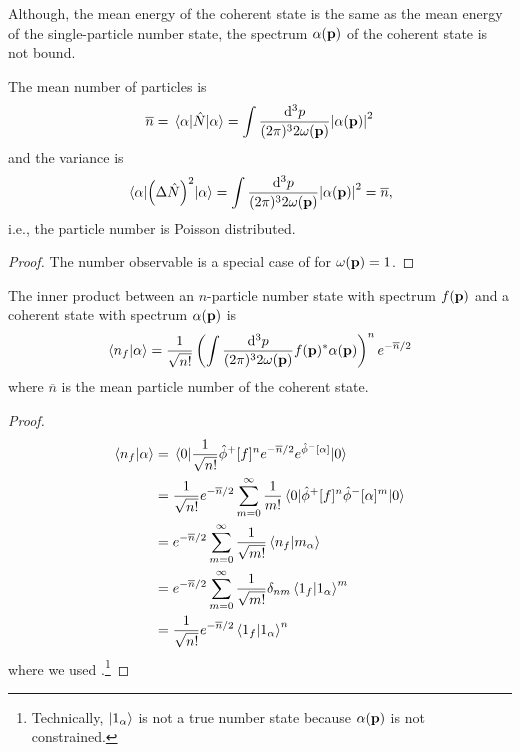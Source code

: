 Although, the mean energy of the coherent state is the same as the mean energy of the single-particle number state, the spectrum $\alpha(\vb{p})$ of the coherent state is not bound.
\begin{lemma}\label{thm:qkg_coherent_state_number}
	The mean number of particles is
	\begin{equation}
		\overline{n}
		=
		\expval{\hat{N}}{\alpha}
		=
		\int\frac{\dd[3]{p}}{(2\pi)^32\omega(\vb{p})}
		\abs{\alpha(\vb{p})}^2
	\end{equation}
	and the variance is
	\begin{equation}
		\expval{\left(\Delta\hat{N}\right)^2}{\alpha}
		=
		\int\frac{\dd[3]{p}}{(2\pi)^32\omega(\vb{p})}
		\abs{\alpha(\vb{p})}^2
		=
		\overline{n}
		,
	\end{equation}
	i.e., the particle number is Poisson distributed.
\end{lemma}
\begin{proof}
	The number observable is a special case of  for $\omega(\vb{p})=1$.
\end{proof}

\begin{lemma}\label{thm:qkg_coherent_state_number_state_inner_product}
	The inner product between an $n$-particle number state with spectrum $f(\vb{p})$ and a coherent state with spectrum $\alpha(\vb{p})$ is
	\begin{equation}
		\braket{n_f}{\alpha}
		=
		\frac{1}{\sqrt{n!}}
		\left(
			\int\frac{\dd[3]{p}}{(2\pi)^32\omega(\vb{p})}
			f(\vb{p})^*
			\alpha(\vb{p})
		\right)^n
		e^{-\overline{n}/2}
	\end{equation}
	where $\overline{n}$ is the mean particle number of the coherent state.
\end{lemma}
\begin{proof}
	\begin{equation*}
		\begin{split}
			\braket{n_f}{\alpha}
			&=
			\expval{
				\frac{1}{\sqrt{n!}}
				\hat\phi^+[f]^n
				e^{-\overline{n}/2}
				e^{\hat\phi^-[\alpha]}
			}{0}
			\\
			&=
			\frac{1}{\sqrt{n!}}
			e^{-\overline{n}/2}
			\sum_{m=0}^\infty
			\frac{1}{m!}
			\expval{
				\hat\phi^+[f]^n
				\hat\phi^-[\alpha]^m
			}{0}
			\\
			&=
			e^{-\overline{n}/2}
			\sum_{m=0}^\infty
			\frac{1}{\sqrt{m!}}
			\braket{n_f}{m_\alpha}
			\\
			&=
			e^{-\overline{n}/2}
			\sum_{m=0}^\infty
			\frac{1}{\sqrt{m!}}
			\delta_{nm}
			\braket{1_f}{1_\alpha}^m
			\\
			&=
			\frac{1}{\sqrt{n!}}
			e^{-\overline{n}/2}
			\braket{1_f}{1_\alpha}^n
		\end{split}
	\end{equation*}
	where we used .\footnote{Technically, $\ket{1_\alpha}$ is not a true number state because $\alpha(\vb{p})$ is not constrained.}
\end{proof}

